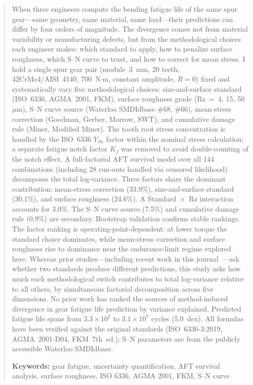 \documentclass[12pt,a4paper]{article}
\begin{document}
\begin{abstract}
\label{sec:abstract}

When three engineers compute the bending fatigue life of the same spur
gear---same geometry, same material, same load---their predictions can
differ by four orders of magnitude. The divergence comes not from
material variability or manufacturing defects, but from the
methodological choices each engineer makes: which standard to apply, how
to penalize surface roughness, which S--N curve to trust, and how to
correct for mean stress. I hold a single spur gear pair
(module~3~mm,%
20 teeth,%
42CrMo4/AISI~4140,%
700~N$\cdot$m,%
constant amplitude, $R=0$) fixed and systematically vary five methodological%
choices: size-and-surface standard (ISO~6336, AGMA~2001, FKM), surface
roughness grade (Rz~=~4, 15, 50~$\mu$m), S--N curve source (Waterloo
SMDIdbase \#68, \#66), mean-stress correction (Goodman, Gerber, Morrow,
SWT), and cumulative damage rule (Miner, Modified Miner). The tooth
root stress concentration is handled by the ISO~6336 $Y_{Sa}$ factor
within the nominal stress calculation; a separate fatigue notch factor
$K_f$ was removed to avoid double-counting of the notch effect. A
full-factorial AFT survival model over all 144 combinations (including
28 run-outs handled via censored likelihood) decomposes the total
log-variance. Three factors share the dominant contribution: mean-stress
correction (33.9\%), size-and-surface standard (30.1\%), and surface
roughness (24.6\%). A Standard~$\times$~Rz interaction accounts for
3.0\%. The S--N curve source (7.5\%) and cumulative damage rule (0.9\%)
are secondary. Bootstrap validation confirms stable
rankings.%
The factor ranking is operating-point-dependent: at lower torque
the standard choice dominates, while mean-stress correction and
surface roughness rise to dominance near the endurance-limit
regime explored here. Whereas prior studies---including recent work in this
journal~\cite{bonaiti2024}---ask whether two standards produce different
predictions, this study asks how much each methodological switch contributes
to total log-variance relative to all others, by simultaneous factorial
decomposition across five dimensions. No prior work has ranked the
sources of method-induced divergence in gear fatigue life prediction by
variance explained. Predicted fatigue life spans from $3.3\times10^2$ to
$3.1\times10^7$ cycles (5.0~dex).%
All formulas have been verified against the original standards (ISO~6336-3:2019, AGMA~2001-D04,
FKM~7th~ed.); S--N parameters are from the publicly accessible Waterloo
SMDIdbase.

\textbf{Keywords:} gear fatigue, uncertainty quantification, AFT survival analysis,
surface roughness, ISO 6336, AGMA 2001, FKM, S--N curve
\end{abstract}
\end{document}
